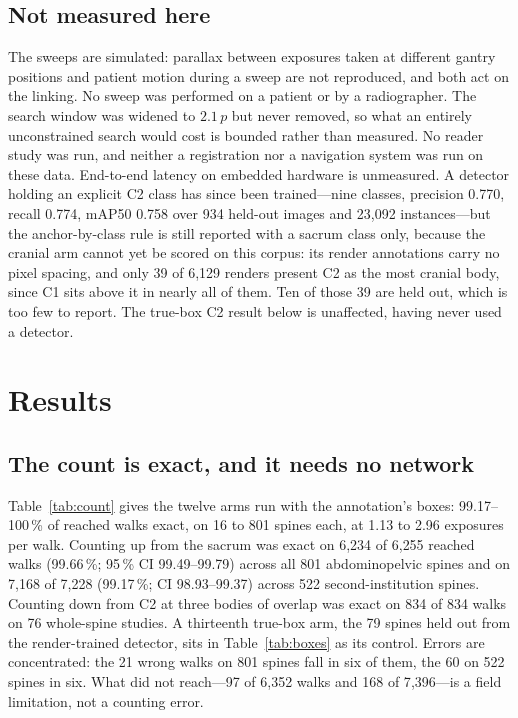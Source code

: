 \documentclass[11pt,letterpaper]{article}
\begin{document}
\subsection*{Not measured here}
The sweeps are simulated: parallax between exposures taken at different gantry positions and patient motion
during a sweep are not reproduced, and both act on the linking. No sweep was performed on a patient or by a
radiographer. The search window was widened to $2.1\,p$ but never removed, so what an entirely
unconstrained search would cost is bounded rather than measured. No reader study was run, and neither a
registration nor a navigation system was run on these
data. End-to-end latency on embedded hardware is unmeasured. A detector holding an explicit C2 class has since
been trained---nine classes, precision 0.770, recall 0.774, mAP50 0.758 over 934 held-out images and
23{,}092 instances---but the anchor-by-class rule is still reported with a sacrum class only, because
the cranial arm cannot yet be scored on this corpus: its render annotations carry no pixel spacing, and
only 39 of 6{,}129 renders present C2 as the most cranial body, since C1 sits above it in nearly all of
them. Ten of those 39 are held out, which is too few to report. The true-box C2 result below is
unaffected, having never used a detector.

\section*{Results}

\subsection*{The count is exact, and it needs no network}
Table~\ref{tab:count} gives the twelve arms run with the annotation's boxes: 99.17--100\,\% of reached walks
exact, on 16 to 801 spines each, at 1.13 to 2.96 exposures per walk. Counting up from the sacrum was exact
on 6{,}234 of 6{,}255 reached walks (99.66\,\%; 95\,\% CI 99.49--99.79) across all 801 abdominopelvic
spines and on 7{,}168 of 7{,}228 (99.17\,\%; CI 98.93--99.37) across 522 second-institution spines.
Counting down from C2 at three bodies of overlap was exact on 834 of 834 walks on 76 whole-spine studies.
A thirteenth true-box arm, the 79 spines held out from the render-trained detector, sits in
Table~\ref{tab:boxes} as its control. Errors are concentrated: the 21 wrong walks on 801 spines fall in six
of them, the 60 on 522 spines in six. What did not reach---97 of 6{,}352 walks and 168 of 7{,}396---is a
field limitation, not a counting error.
\end{document}
